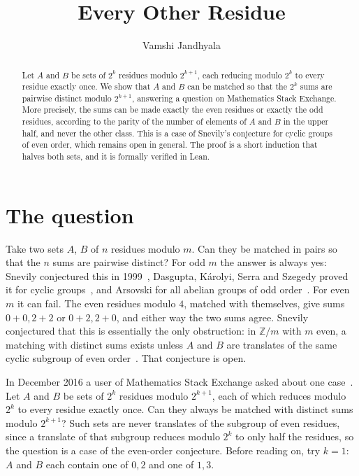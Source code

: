 \documentclass[11pt]{amsart}
\title{Every Other Residue}
\author{Vamshi Jandhyala}
\theoremstyle{remark}
\begin{document}
\begin{abstract}
Let $A$ and $B$ be sets of $2^k$ residues modulo $2^{k+1}$, each reducing modulo $2^k$ to every residue exactly once. We show that $A$ and $B$ can be matched so that the $2^k$ sums are pairwise distinct modulo $2^{k+1}$, answering a question on Mathematics Stack Exchange. More precisely, the sums can be made exactly the even residues or exactly the odd residues, according to the parity of the number of elements of $A$ and $B$ in the upper half, and never the other class. This is a case of Snevily's conjecture for cyclic groups of even order, which remains open in general. The proof is a short induction that halves both sets, and it is formally verified in Lean.
\end{abstract}

\maketitle

\section{The question}

Take two sets $A$, $B$ of $n$ residues modulo $m$. Can they be matched in pairs so that the $n$ sums are pairwise distinct? For odd $m$ the answer is always yes: Snevily conjectured this in 1999~\cite{Snevily}, Dasgupta, Károlyi, Serra and Szegedy proved it for cyclic groups~\cite{DKSS}, and Arsovski for all abelian groups of odd order~\cite{Arsovski}. For even $m$ it can fail. The even residues modulo $4$, matched with themselves, give sums $0+0,2+2$ or $0+2,2+0$, and either way the two sums agree. Snevily conjectured that this is essentially the only obstruction: in $\mathbb Z/m$ with $m$ even, a matching with distinct sums exists unless $A$ and $B$ are translates of the same cyclic subgroup of even order~\cite{Snevily,DKSS}. That conjecture is open.

In December 2016 a user of Mathematics Stack Exchange asked about one case~\cite{MSE}. Let $A$ and $B$ be sets of $2^k$ residues modulo $2^{k+1}$, each of which reduces modulo $2^k$ to every residue exactly once. Can they always be matched with distinct sums modulo $2^{k+1}$? Such sets are never translates of the subgroup of even residues, since a translate of that subgroup reduces modulo $2^k$ to only half the residues, so the question is a case of the even-order conjecture. Before reading on, try $k=1$: $A$ and $B$ each contain one of $0,2$ and one of $1,3$.
\end{document}

